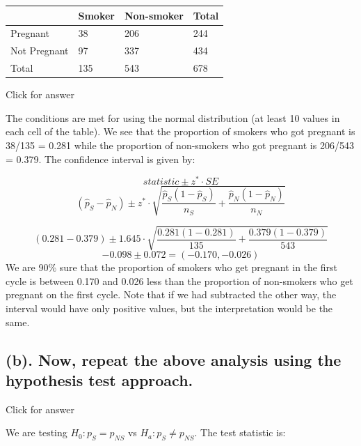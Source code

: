 \documentclass[
]{book}
\begin{document}
\begin{longtable}[]{@{}llll@{}}
\toprule()
~ & Smoker & Non-smoker & Total \\
\midrule()
\endhead
Pregnant & 38 & 206 & 244 \\
Not Pregnant & 97 & 337 & 434 \\
Total & 135 & 543 & 678 \\
\bottomrule()
\end{longtable}

Click for answer

The conditions are met for using the normal distribution (at least 10 values in each cell of the table). We see that the proportion of smokers who got pregnant is 38/135 = 0.281 while the proportion of non-smokers who got pregnant is 206/543 = 0.379. The confidence interval is given by:

\[statistic \pm z^* \cdot SE \]
\[(\hat{p}_S - \hat{p}_N) \pm z^* \cdot \sqrt{\frac{\hat{p}_S(1- \hat{p}_S)}{n_S} + \frac{\hat{p}_N(1- \hat{p}_N)}{n_N}} \]

\[(0.281 - 0.379) \pm 1.645\cdot \sqrt{\frac{0.281(1-0.281)}{135} + \frac{0.379(1-0.379)}{543}} \]
\[-0.098 \pm 0.072 = (-0.170, -0.026) \]
We are 90\% sure that the proportion of smokers who get pregnant in the first cycle is between 0.170 and 0.026 less than the proportion of non-smokers who get pregnant on the first cycle. Note that if we had subtracted the other way, the interval would have only positive values, but the interpretation would be the same.

\hypertarget{b.-now-repeat-the-above-analysis-using-the-hypothesis-test-approach.}{%
\subsection{(b). Now, repeat the above analysis using the hypothesis test approach.}\label{b.-now-repeat-the-above-analysis-using-the-hypothesis-test-approach.}}

Click for answer

We are testing \(H_0:p_S = p_{NS}\) vs \(H_a:p_S \neq p_{NS}\). The test statistic is:
\end{document}
